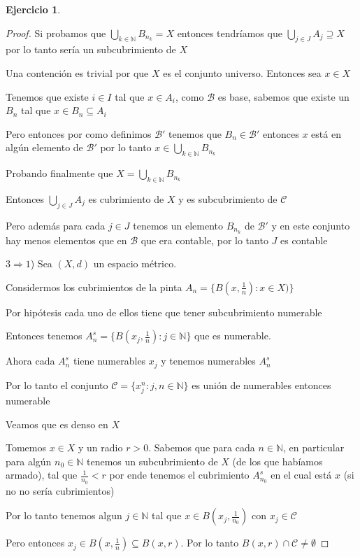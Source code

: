 \documentclass[11pt]{report}
\newcommand{\N}{\mathbb{N}}
\newcommand{\Ra}{\Rightarrow}
\theoremstyle{definition}
\newtheorem{ej}{Ejercicio}
\begin{document}
\begin{ej}
\begin{proof}
		Si probamos que $\bigcup_{k\in\N} B_{n_k} = X$ entonces tendríamos que $\bigcup_{j \in J} A_j \supseteq X$ por lo tanto sería un subcubrimiento de $X$

		Una contención es trivial por que $X$ es el conjunto universo. Entonces sea $x \in X$

		Tenemos que existe $i \in I$ tal que $x \in A_i$, como $\mathcal{B}$ es base, sabemos que existe un $B_n$ tal que $x \in B_n \subseteq A_i$

		Pero entonces por como definimos $\mathcal{B}'$ tenemos que $B_n \in \mathcal{B} '$ entonces $x$ está en algún elemento de $\mathcal{B'}$ por lo tanto $x \in \bigcup_{k\in\N} B_{n_k}$

		Probando finalmente que $X = \bigcup_{k \in \N} B_{n_k}$

		Entonces $\bigcup_{j \in J} A_j$ es cubrimiento de $X$ y es subcubrimiento de $\mathcal{C}$

		Pero además para cada $j \in J$ tenemos un elemento $B_{n_k}$ de $\mathcal{B}'$ y en este conjunto hay menos elementos que en $\mathcal{B}$ que era contable, por lo tanto $J$ es contable

		$3 \Ra 1$) Sea $(X,d)$ un espacio métrico. 

		Considermos los cubrimientos de la pinta $A_n = \{B(x,\frac{1}{n}): x \in X)\}$ 

		Por hipótesis cada uno de ellos tiene que tener subcubrimiento numerable

		Entonces tenemos $A_n^s = \{B(x_j,\frac{1}{n}) :  j \in \N\}$ que es numerable.

		Ahora cada $A_n^s$ tiene numerables $x_j$ y tenemos numerables $A_n^s$ 

		Por lo tanto el conjunto $\mathcal{C} = \{x_j^n : j,n \in \N \}$ es unión de numerables entonces numerable

		Veamos que es denso en $X$

		Tomemos $x \in X$ y un radio $r>0$. Sabemos que para cada $n \in \N$, en particular para algún $n_0 \in \N$ tenemos un subcubrimiento de $X$ (de los que habíamos armado), tal que $\frac{1}{n_0} < r$ por ende tenemos el cubrimiento $A_{n_0}^s$ en el cual está $x$ (si no no sería cubrimientos)

		Por lo tanto tenemos algun $j \in \N$ tal que $x \in B(x_j,\frac{1}{n_0})$ con $x_j \in \mathcal{C}$

		Pero entonces $x_j \in B(x,\frac{1}{n}) \subseteq B(x,r)$. Por lo tanto $B(x,r)\cap \mathcal{C} \neq \emptyset$


\end{proof}
\end{ej}
\end{document}

